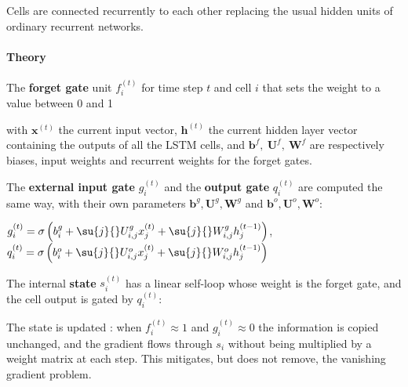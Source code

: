 Cells are connected recurrently to each other replacing the usual hidden units of
ordinary recurrent networks.

\paragraph{Theory}
The \textbf{forget gate} unit $f_{i}^{(t)}$ for time step $t$ and cell $i$ that sets
the weight to a value between 0 and 1
\begin{center}
\end{center}
with $\bm{x}^{(t)}$ the current input vector, $\bm{h}^{(t)}$ the current hidden layer vector
containing the outputs of all the LSTM cells, and $\bm{b}^{f},~\bm{U}^{f},~\bm{W}^{f}$ are
respectively biases, input weights and recurrent weights for the forget gates.

The \textbf{external input gate} $g_{i}^{(t)}$ and the \textbf{output gate} $q_{i}^{(t)}$ are
computed the same way, with their own parameters $\bm{b}^{g},\bm{U}^{g},\bm{W}^{g}$ and
$\bm{b}^{o},\bm{U}^{o},\bm{W}^{o}$:
\begin{center}
    $g_{i}^{(t)} = \sigma\left(b_{i}^{g} + \su{j}{}U_{i,j}^{g}x_{j}^{(t)} +
    \su{j}{}W_{i,j}^{g}h_{j}^{(t-1)}\right)$,\qquad
    $q_{i}^{(t)} = \sigma\left(b_{i}^{o} + \su{j}{}U_{i,j}^{o}x_{j}^{(t)} +
    \su{j}{}W_{i,j}^{o}h_{j}^{(t-1)}\right)$
\end{center}
The internal \textbf{state} $s_{i}^{(t)}$ has a linear self-loop whose weight is the forget
gate, and the cell output is gated by $q_{i}^{(t)}$:
\begin{center}
\end{center}
The state is updated : when $f_{i}^{(t)}\approx 1$ and $g_{i}^{(t)}\approx 0$
the information is copied unchanged, and the gradient flows through $s_{i}$ without being
multiplied by a weight matrix at each step. This mitigates, but does not remove,
the vanishing gradient problem.

